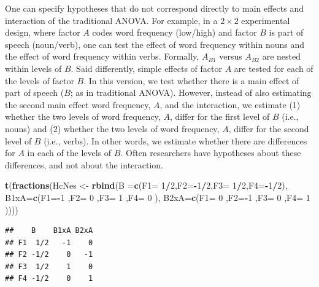 \documentclass[12pt,]{krantz}
\newenvironment{Shaded}{\begin{snugshade}}{\end{snugshade}}
\newcommand{\KeywordTok}[1]{\textcolor[rgb]{0.13,0.29,0.53}{\textbf{#1}}}
\newcommand{\DataTypeTok}[1]{\textcolor[rgb]{0.13,0.29,0.53}{#1}}
\newcommand{\DecValTok}[1]{\textcolor[rgb]{0.00,0.00,0.81}{#1}}
\newcommand{\StringTok}[1]{\textcolor[rgb]{0.31,0.60,0.02}{#1}}
\newcommand{\OperatorTok}[1]{\textcolor[rgb]{0.81,0.36,0.00}{\textbf{#1}}}
\newcommand{\NormalTok}[1]{#1}
\theoremstyle{definition}
\theoremstyle{definition}
\theoremstyle{definition}
\theoremstyle{remark}
\begin{document}
One can specify hypotheses that do not correspond directly to main
effects and interaction of the traditional ANOVA. For example, in a
\(2 \times 2\) experimental design, where factor \(A\) codes word
frequency (low/high) and factor \(B\) is part of speech (noun/verb), one
can test the effect of word frequency within nouns and the effect of
word frequency within verbs. Formally, \(A_{B1}\) versus \(A_{B2}\) are
nested within levels of \(B\). Said differently, simple effects of
factor \(A\) are tested for each of the levels of factor \(B\). In this
version, we test whether there is a main effect of part of speech
(\(B\); as in traditional ANOVA). However, instead of also estimating
the second main effect word frequency, \(A\), and the interaction, we
estimate (1) whether the two levels of word frequency, \(A\), differ for
the first level of \(B\) (i.e., nouns) and (2) whether the two levels of
word frequency, \(A\), differ for the second level of \(B\) (i.e.,
verbs). In other words, we estimate whether there are differences for
\(A\) in each of the levels of \(B\). Often researchers have hypotheses
about these differences, and not about the interaction.

\begin{Shaded}
\begin{Highlighting}[]
\KeywordTok{t}\NormalTok{(}\KeywordTok{fractions}\NormalTok{(HcNes <-}\StringTok{ }\KeywordTok{rbind}\NormalTok{(}\DataTypeTok{B   =}\KeywordTok{c}\NormalTok{(}\DataTypeTok{F1=} \DecValTok{1}\OperatorTok{/}\DecValTok{2}\NormalTok{,}\DataTypeTok{F2=}\OperatorTok{-}\DecValTok{1}\OperatorTok{/}\DecValTok{2}\NormalTok{,}\DataTypeTok{F3=} \DecValTok{1}\OperatorTok{/}\DecValTok{2}\NormalTok{,}\DataTypeTok{F4=}\OperatorTok{-}\DecValTok{1}\OperatorTok{/}\DecValTok{2}\NormalTok{),}
                           \DataTypeTok{B1xA=}\KeywordTok{c}\NormalTok{(}\DataTypeTok{F1=}\OperatorTok{-}\DecValTok{1}\NormalTok{  ,}\DataTypeTok{F2=} \DecValTok{0}\NormalTok{  ,}\DataTypeTok{F3=} \DecValTok{1}\NormalTok{  ,}\DataTypeTok{F4=} \DecValTok{0}\NormalTok{  ),}
                           \DataTypeTok{B2xA=}\KeywordTok{c}\NormalTok{(}\DataTypeTok{F1=} \DecValTok{0}\NormalTok{  ,}\DataTypeTok{F2=}\OperatorTok{-}\DecValTok{1}\NormalTok{  ,}\DataTypeTok{F3=} \DecValTok{0}\NormalTok{  ,}\DataTypeTok{F4=} \DecValTok{1}\NormalTok{ ))))}
\end{Highlighting}
\end{Shaded}

\begin{verbatim}
##    B    B1xA B2xA
## F1  1/2   -1    0
## F2 -1/2    0   -1
## F3  1/2    1    0
## F4 -1/2    0    1
\end{verbatim}
\end{document}
